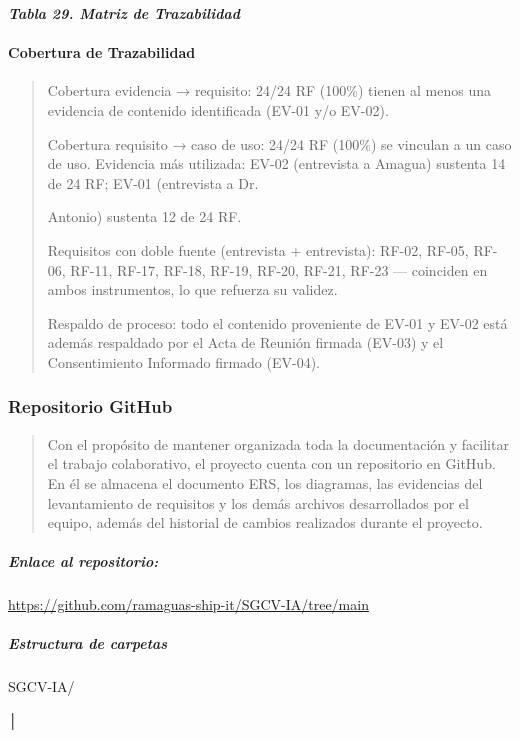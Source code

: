 \documentclass[
]{article}
\begin{document}
\protect{}\label{_bookmark113}{}\emph{\textbf{Tabla 29.
Matriz de Trazabilidad}}

\paragraph{Cobertura de Trazabilidad}\label{cobertura-de-trazabilidad}

\begin{quote}
Cobertura evidencia → requisito: 24/24 RF (100\%) tienen al menos una
evidencia de contenido identificada (EV-01 y/o EV-02).

Cobertura requisito → caso de uso: 24/24 RF (100\%) se vinculan a un
caso de uso. Evidencia más utilizada: EV-02 (entrevista a Amagua)
sustenta 14 de 24 RF; EV-01 (entrevista a Dr.

Antonio) sustenta 12 de 24 RF.

Requisitos con doble fuente (entrevista + entrevista): RF-02, RF-05,
RF-06, RF-11, RF-17, RF-18, RF-19, RF-20, RF-21, RF-23 --- coinciden en
ambos instrumentos, lo que refuerza su validez.

Respaldo de proceso: todo el contenido proveniente de EV-01 y EV-02 está
además respaldado por el Acta de Reunión firmada (EV-03) y el
Consentimiento Informado firmado (EV-04).
\end{quote}

\subsubsection{Repositorio GitHub}\label{repositorio-github}

\begin{quote}
Con el propósito de mantener organizada toda la documentación y
facilitar el trabajo colaborativo, el proyecto cuenta con un repositorio
en GitHub. En él se almacena el documento ERS, los diagramas, las
evidencias del levantamiento de requisitos y los demás archivos
desarrollados por el equipo, además del historial de cambios realizados
durante el proyecto.
\end{quote}

\subparagraph{Enlace al repositorio:}\label{enlace-al-repositorio}

\url{https://github.com/ramaguas-ship-it/SGCV-IA/tree/main}

\subparagraph{Estructura de carpetas}\label{estructura-de-carpetas}

SGCV-IA/

│
\end{document}
